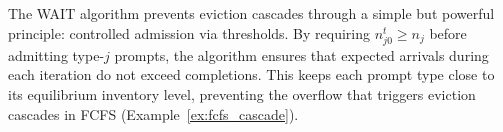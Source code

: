 

The WAIT algorithm prevents eviction cascades through a simple but powerful principle: controlled admission via thresholds. By requiring $n_{j0}^t \geq n_j$ before admitting type-$j$ prompts, the algorithm ensures that expected arrivals during each iteration do not exceed completions. This keeps each prompt type close to its equilibrium inventory level, preventing the overflow that triggers eviction cascades in FCFS (Example~\ref{ex:fcfs_cascade}).


